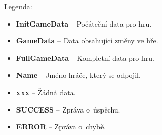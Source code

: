 \documentclass[12pt, a4paper]{article}
\begin{document}
\large
Legenda:
\normalsize
\begin{itemize}
    \item \textbf{InitGameData} -- Počáteční data pro hru.
    \item \textbf{GameData} -- Data obsahující změny ve hře.
    \item \textbf{FullGameData} -- Kompletní data pro hru.
    \item \textbf{Name} -- Jméno hráče, který se odpojil.
    \item \textbf{xxx} -- Žádná data.
    \item \textbf{SUCCESS} -- Zpráva o~úspěchu.
    \item \textbf{ERROR} -- Zpráva o~chybě.
\end{itemize}

\newpage
\end{document}
